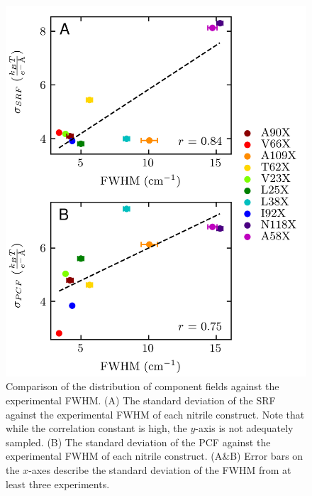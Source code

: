 \begin{figure}
    \center
    \includegraphics[width=\single]{figures-snase/combined_standard_deviations.png}
    \caption[Distribution of component fields against the experimental FWHM]{
        Comparison of the distribution of component fields against the experimental FWHM. 
        (A) The standard deviation of the SRF against the experimental FWHM of each nitrile construct. 
        Note that while the correlation constant is high, the $y$-axis is not adequately sampled. 
        (B) The standard deviation of the PCF against the experimental FWHM of each nitrile construct. 
        (A\&B) Error bars on the $x$-axes describe the standard deviation of the FWHM from at least three experiments.
    }
    \label{fig:snase-component_std}
\end{figure}

